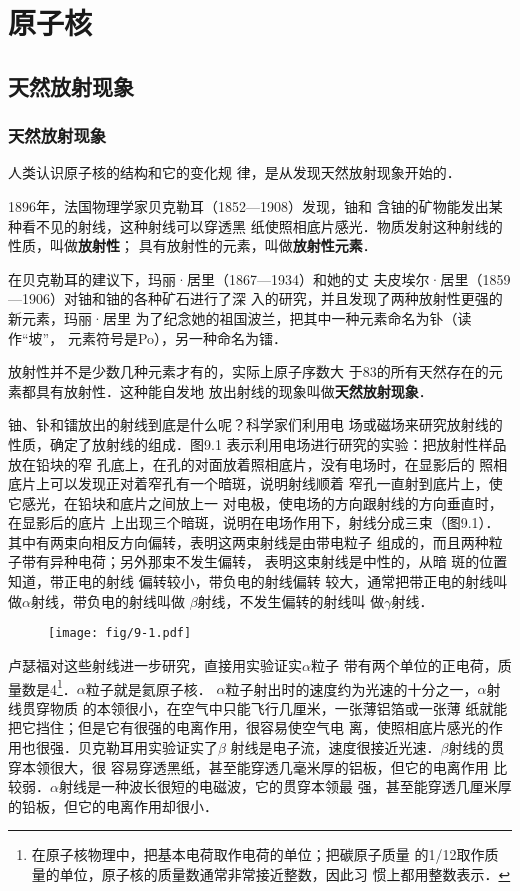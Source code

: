 \chapter{原子核}
\section{天然放射现象}

\subsection{天然放射现象}

人类认识原子核的结构和它的变化规
律，是从发现天然放射现象开始的．

1896年，法国物理学家贝克勒耳（1852—1908）发现，铀和
含铀的矿物能发出某种看不见的射线，这种射线可以穿透黑
纸使照相底片感光．物质发射这种射线的性质，叫做\textbf{放射性}；
具有放射性的元素，叫做\textbf{放射性元素}．

在贝克勒耳的建议下，玛丽·居里（1867—1934）和她的丈
夫皮埃尔·居里（1859—1906）对铀和铀的各种矿石进行了深
入的研究，并且发现了两种放射性更强的新元素，玛丽·居里
为了纪念她的祖国波兰，把其中一种元素命名为钋（读作“坡”，
元素符号是Po），另一种命名为镭．

放射性并不是少数几种元素才有的，实际上原子序数大
于83的所有天然存在的元素都具有放射性．这种能自发地
放出射线的现象叫做\textbf{天然放射现象}．

铀、钋和镭放出的射线到底是什么呢？科学家们利用电
场或磁场来研究放射线的性质，确定了放射线的组成．图9.1
表示利用电场进行研究的实验：把放射性样品放在铅块的窄
孔底上，在孔的对面放着照相底片，没有电场时，在显影后的
照相底片上可以发现正对着窄孔有一个暗斑，说明射线顺着
窄孔一直射到底片上，使它感光，在铅块和底片之间放上一
对电极，使电场的方向跟射线的方向垂直时，在显影后的底片
上出现三个暗斑，说明在电场作用下，射线分成三束（图9.1）．
其中有两束向相反方向偏转，表明这两束射线是由带电粒子
组成的，而且两种粒子带有异种电荷；另外那束不发生偏转，
表明这束射线是中性的，从暗
斑的位置知道，带正电的射线
偏转较小，带负电的射线偏转
较大，通常把带正电的射线叫
做$\alpha$射线，带负电的射线叫做
$\beta$射线，不发生偏转的射线叫
做$\gamma$射线．

\begin{figure}[htp]
    \centering
    \texttt{[image: fig/9-1.pdf]}
    \caption{}
\end{figure}

卢瑟福对这些射线进一步研究，直接用实验证实$\alpha$粒子
带有两个单位的正电荷，质量数是4\footnote{在原子核物理中，把基本电荷取作电荷的单位；把碳原子质量
的1/12取作质量的单位，原子核的质量数通常非常接近整数，因此习
惯上都用整数表示．}．$\alpha$粒子就是氦原子核．
$\alpha$粒子射出时的速度约为光速的十分之一，$\alpha$射线贯穿物质
的本领很小，在空气中只能飞行几厘米，一张薄铝箔或一张薄
纸就能把它挡住；但是它有很强的电离作用，很容易使空气电
离，使照相底片感光的作用也很强．贝克勒耳用实验证实了$\beta$
射线是电子流，速度很接近光速．$\beta$射线的贯穿本领很大，很
容易穿透黑纸，甚至能穿透几毫米厚的铝板，但它的电离作用
比较弱．$\alpha$射线是一种波长很短的电磁波，它的贯穿本领最
强，甚至能穿透几厘米厚的铅板，但它的电离作用却很小．

